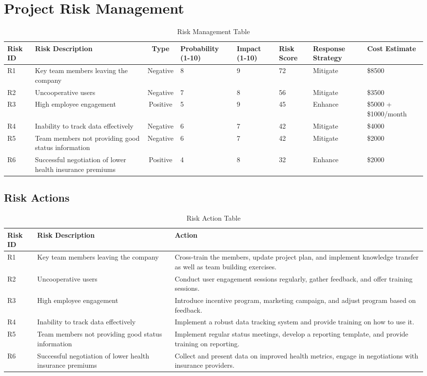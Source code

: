 \chapter{Project Risk Management}
\begin{longtable}{|p{1cm}|p{2.5cm}|c|p{1.8cm}|p{1.4cm}|p{1cm}|p{1.8cm}|p{2cm}|}
    \caption{Risk Management Table} \label{tab:title}
    \hline
    \textbf{Risk ID} & \textbf{Risk Description} & \textbf{Type} & \textbf{Probability (1-10)} & \textbf{Impact (1-10)} & \textbf{Risk Score} & \textbf{Response Strategy} & \textbf{Cost Estimate} \\
    \hline
    R1 & Key team members leaving the company & Negative & 8 & 9 & 72 & Mitigate & \$8500 \\
    \hline
    R2 & Uncooperative users & Negative & 7 & 8 & 56 & Mitigate & \$3500 \\
    \hline
    R3 & High employee engagement & Positive & 5 & 9 & 45 & Enhance & \$5000 + \$1000/month \\
    \hline
    R4 & Inability to track data effectively & Negative & 6 & 7 & 42 & Mitigate & \$4000 \\
    \hline
    R5 & Team members not providing good status information & Negative & 6 & 7 & 42 & Mitigate & \$2000 \\
    \hline
    R6 & Successful negotiation of lower health insurance premiums & Positive & 4 & 8 & 32 & Enhance & \$2000 \\
    \hline
\end{longtable}

\section*{Risk Actions}
\begin{longtable}{|p{1cm}|p{5cm}|p{9cm}|}
    \caption{Risk Action Table} \label{tab:title}
    \hline
    \textbf{Risk ID} & \textbf{Risk Description} & \textbf{Action} \\
    \hline
    R1 & Key team members leaving the company & Cross-train the members, update project plan, and implement knowledge transfer as well as team building exercises. \\
    \hline
    R2 & Uncooperative users & Conduct user engagement sessions regularly, gather feedback, and offer training sessions. \\
    \hline
    R3 & High employee engagement & Introduce incentive program, marketing campaign, and adjust program based on feedback. \\
    \hline
    R4 & Inability to track data effectively & Implement a robust data tracking system and provide training on how to use it. \\
    \hline
    R5 & Team members not providing good status information & Implement regular status meetings, develop a reporting template, and provide training on reporting. \\
    \hline
    R6 & Successful negotiation of lower health insurance premiums & Collect and present data on improved health metrics, engage in negotiations with insurance providers. \\
    \hline
\end{longtable}

